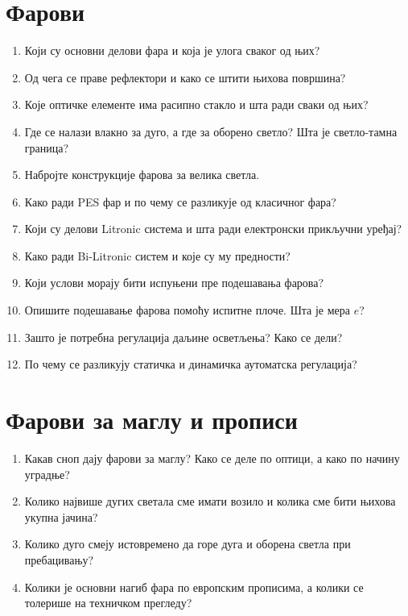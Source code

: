 \documentclass{article}
\begin{document}
\section*{Фарови}
\begin{enumerate}[resume*=pitanja]
    \item Који су основни делови фара и која је улога сваког од њих?
    \item Од чега се праве рефлектори и како се штити њихова површина?
    \item Које оптичке елементе има расипно стакло и шта ради сваки од њих?
    \item Где се налази влакно за дуго, а где за оборено светло? Шта је светло-тамна граница?
    \item Набројте конструкције фарова за велика светла.
    \item Како ради PES фар и по чему се разликује од класичног фара?
    \item Који су делови Litronic система и шта ради електронски прикључни уређај?
    \item Како ради Bi-Litronic систем и које су му предности?
    \item Који услови морају бити испуњени пре подешавања фарова?
    \item Опишите подешавање фарова помоћу испитне плоче. Шта је мера $e$?
    \item Зашто је потребна регулација даљине осветљења? Како се дели?
    \item По чему се разликују статичка и динамичка аутоматска регулација?
\end{enumerate}

\section*{Фарови за маглу и прописи}
\begin{enumerate}[resume*=pitanja]
    \item Какав сноп дају фарови за маглу? Како се деле по оптици, а како по начину уградње?
    \item Колико највише дугих светала сме имати возило и колика сме бити њихова укупна јачина?
    \item Колико дуго смеју истовремено да горе дуга и оборена светла при пребацивању?
    \item Колики је основни нагиб фара по европским прописима, а колики се толерише на техничком прегледу?
\end{enumerate}
\end{document}

